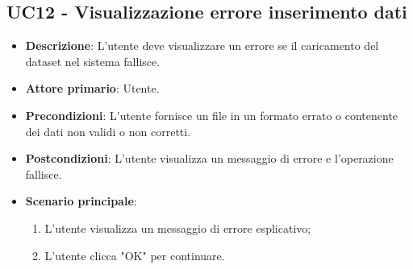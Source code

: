 \subsection{UC12 - Visualizzazione errore inserimento dati}
\begin{itemize}
	\item \textbf{Descrizione}: L'utente deve visualizzare un errore se il caricamento del dataset nel sistema fallisce.
	\item \textbf{Attore primario}: Utente.
	\item \textbf{Precondizioni}: L'utente fornisce un file in un formato errato o contenente dei dati non validi o non corretti.
	\item \textbf{Postcondizioni}: L'utente visualizza un messaggio di errore e l'operazione fallisce.
	\item \textbf{Scenario principale}:
		\begin{enumerate}
			\item L'utente visualizza un messaggio di errore esplicativo;
			\item L'utente clicca "OK" per continuare.
		\end{enumerate}
\end{itemize}